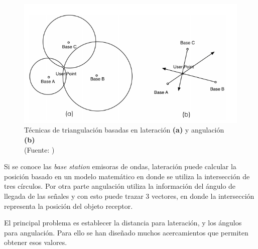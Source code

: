 \begin{figure}[ht!]
\centering
\includegraphics[width=.4\textwidth]{figures/triangulacion.png}
\caption[abs]{Técnicas de triangulación basadas en lateración \textbf{(a)} y angulación \textbf{(b)}\\
{\scriptsize (Fuente: \citep{Liu:2007:SWI:2220431.2221077})}}
\label{fig:triangulacion}
\end{figure}

Si se conoce las \textit{base station} emisoras de ondas, lateración puede calcular la posición basado en un modelo matemático en donde se utiliza la intersección de tres círculos. Por otra parte angulación utiliza la información del ángulo de llegada de las señales y con esto puede trazar 3 vectores, en donde la intersección representa la posición del objeto receptor.

El principal problema es establecer la distancia para lateración, y los ángulos para angulación. Para ello se han diseñado muchos acercamientos que permiten obtener esos valores.

